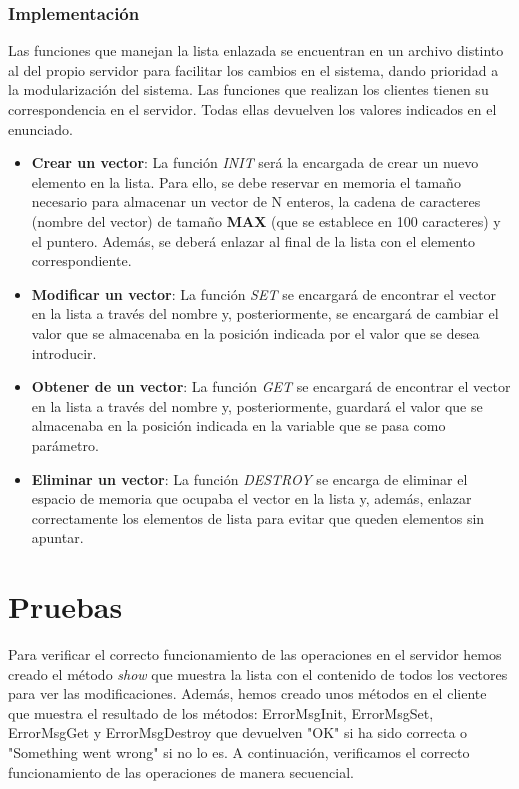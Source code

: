 \documentclass[10pt, spanish, pdftex]{template/UC3M_document}
\begin{document}
\subsubsection{Implementación}
Las funciones que manejan la lista enlazada se encuentran en un archivo distinto al del propio servidor para facilitar los cambios en el sistema, dando prioridad a la modularización del sistema. Las funciones que realizan los clientes tienen su correspondencia en el servidor. Todas ellas devuelven los valores indicados en el enunciado.
\begin{itemize}
    \item \textbf{Crear un vector}: La función \textit{INIT} será la encargada de crear un nuevo elemento en la lista. Para ello, se debe reservar en memoria el tamaño necesario para almacenar un vector de N enteros, la cadena de caracteres (nombre del vector) de tamaño \textbf{MAX} (que se establece en 100 caracteres) y el puntero. Además, se deberá enlazar al final de la lista con el elemento correspondiente.
    \item \textbf{Modificar un vector}: La función \textit{SET} se encargará de encontrar el vector en la lista a través del nombre y, posteriormente, se encargará de cambiar el valor que se almacenaba en la posición indicada por el valor que se desea introducir.
    \item \textbf{Obtener de un vector}: La función \textit{GET} se encargará de encontrar el vector en la lista a través del nombre y, posteriormente, guardará el valor que se almacenaba en la posición indicada en la variable que se pasa como parámetro.
    \item \textbf{Eliminar un vector}: La función \textit{DESTROY} se encarga de eliminar el espacio de memoria que ocupaba el vector en la lista y, además, enlazar correctamente los elementos de lista para evitar que queden elementos sin apuntar.
\end{itemize}

\section{Pruebas}
Para verificar el correcto funcionamiento de las operaciones en el servidor hemos creado el método \textit{show} que muestra la lista con el contenido de todos los vectores para ver las modificaciones. Además, hemos creado unos métodos en el cliente que muestra el resultado de los métodos: ErrorMsgInit, ErrorMsgSet, ErrorMsgGet y ErrorMsgDestroy que devuelven "OK" si ha sido correcta o "Something went wrong" si no lo es. A continuación, verificamos el correcto funcionamiento de las operaciones de manera secuencial.
\end{document}
